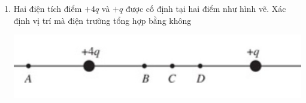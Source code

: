 \begin{enumerate}[label=\bfseries Câu \arabic*:]
\item Hai điện tích điểm $+4q$ và $+q$ được cố định tại hai điểm như hình vẽ. Xác định vị trí mà điện trường tổng hợp bằng không
\begin{center}
	\includegraphics[width=0.55\linewidth]{../figs/PH11-FinalSem2-01-1}
\end{center}


\end{enumerate}
